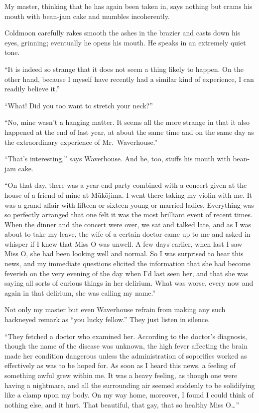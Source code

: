 \documentclass{book}
\begin{document}
My master, thinking that he has again been taken in, says nothing but
crams his mouth with bean-jam cake and mumbles incoherently.

Coldmoon carefully rakes smooth the ashes in the brazier and casts down
his eyes, grinning; eventually he opens his mouth. He speaks in an
extremely quiet tone.

``It is indeed so strange that it does not seem a thing likely to
happen. On the other hand, because I myself have recently had a similar
kind of experience, I can readily believe it.''

``What! Did you too want to stretch your neck?''

``No, mine wasn't a hanging matter. It seems all the more strange in
that it also happened at the end of last year, at about the same time
and on the same day as the extraordinary experience of Mr.~Waverhouse.''

``That's interesting,'' says Waverhouse. And he, too, stuffs his mouth
with bean-jam cake.

``On that day, there was a year-end party combined with a concert given
at the house of a friend of mine at Mūkōjima. I went there taking my
violin with me. It was a grand affair with fifteen or sixteen young or
married ladies. Everything was so perfectly arranged that one felt it
was the most brilliant event of recent times. When the dinner and the
concert were over, we sat and talked late, and as I was about to take my
leave, the wife of a certain doctor came up to me and asked in whisper
if I knew that Miss O was unwell. A few days earlier, when last I saw
Miss O, she had been looking well and normal. So I was surprised to hear
this news, and my immediate questions elicited the information that she
had become feverish on the very evening of the day when I'd last seen
her, and that she was saying all sorts of curious things in her
delirium. What was worse, every now and again in that delirium, she was
calling my name.''

Not only my master but even Waverhouse refrain from making any such
hackneyed remark as ``you lucky fellow.'' They just listen in silence.

``They fetched a doctor who examined her. According to the doctor's
diagnosis, though the name of the disease was unknown, the high fever
affecting the brain made her condition dangerous unless the
administration of soporifics worked as effectively as was to be hoped
for. As soon as I heard this news, a feeling of something awful grew
within me. It was a heavy feeling, as though one were having a
nightmare, and all the surrounding air seemed suddenly to be solidifying
like a clamp upon my body. On my way home, moreover, I found I could
think of nothing else, and it hurt. That beautiful, that gay, that so
healthy Miss O\ldots{}''
\end{document}
